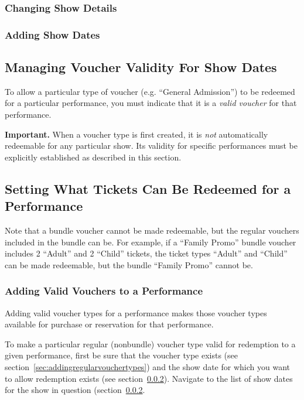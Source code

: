 \subsubsection{Changing Show Details}
\label{sec:changingshowdetails}

\subsubsection{Adding Show Dates}
\label{sec:addingshowdates}

\subsection{Managing Voucher Validity For Show Dates}

To allow a particular type of voucher (e.g. ``General Admission'') to be
redeemed for a particular performance, you must indicate that it is a
\emph{valid voucher} for that performance.

\textbf{Important.} When a voucher type is first created, it is
\emph{not} automatically redeemable for any particular show.  Its
validity for specific performances must be explicitly established as
described in this section.

\subsection{Setting What Tickets Can Be Redeemed for a Performance}
\label{sec:validvouchers}

Note that a bundle voucher cannot be made redeemable, but the regular
vouchers included in the bundle can be.  For example, if a ``Family
Promo'' bundle voucher includes 2 ``Adult'' and 2 ``Child'' tickets, the
ticket types ``Adult'' and ``Child'' can be made redeemable, but the
bundle ``Family Promo'' cannot be.

\subsubsection{Adding Valid Vouchers to a Performance}
\label{sec:addingvalidvouchers}

Adding valid voucher types for a performance makes those voucher types
available for purchase or reservation for that performance.

To make a particular regular (nonbundle) voucher type valid for
redemption to a given performance, first be sure that the voucher type
exists (see section~\ref{sec:addingregularvouchertypes}) and the show
date for which you want to allow redemption exists (see
section~\ref{sec:addingshowdates}).  Navigate to the list of show dates
for the show in question (section~\ref{sec:addingshowdates}.

